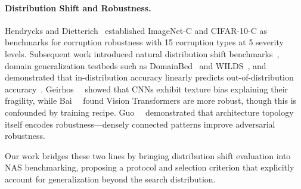 \paragraph{Distribution Shift and Robustness.}
Hendrycks and Dietterich~\cite{hendrycks2019benchmarking} established ImageNet-C and CIFAR-10-C as benchmarks for corruption robustness with 15 corruption types at 5 severity levels.
Subsequent work introduced natural distribution shift benchmarks~\cite{recht2019imagenet,hendrycks2021many}, domain generalization testbeds such as DomainBed~\cite{gulrajani2021in} and WILDS~\cite{koh2021wilds}, and demonstrated that in-distribution accuracy linearly predicts out-of-distribution accuracy~\cite{taori2020measuring,miller2021accuracy}.
Geirhos~\etal~\cite{geirhos2019texture} showed that CNNs exhibit texture bias explaining their fragility, while Bai~\etal~\cite{bai2021transformers} found Vision Transformers are more robust, though this is confounded by training recipe.
Guo~\etal~\cite{guo2020robnet} demonstrated that architecture topology itself encodes robustness---densely connected patterns improve adversarial robustness.

Our work bridges these two lines by bringing distribution shift evaluation into NAS benchmarking, proposing a protocol and selection criterion that explicitly account for generalization beyond the search distribution.
